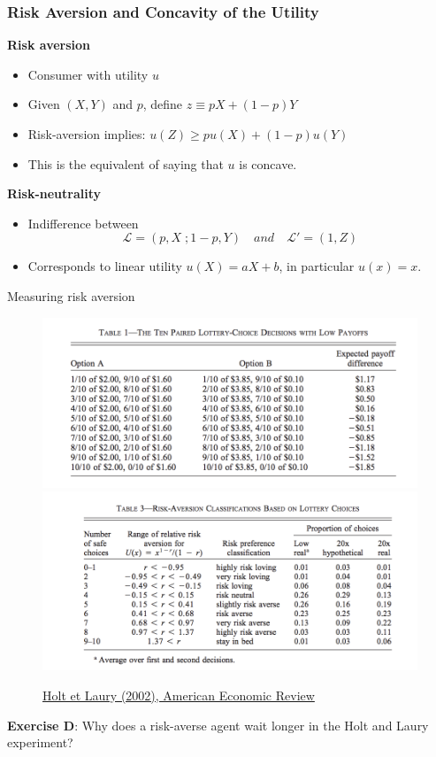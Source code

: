 \documentclass[handout]{beamer}
\newenvironment{iPar}[1]{\textbf{#1} \begin{itemize}}{\end{itemize}}
\newcommand{\mdp}{\medskip \pause}
\begin{document}
\begin{frame}\frametitle{Risk Aversion and Concavity of the Utility}

\begin{iPar}{Risk aversion} \item Consumer with utility $u$ \item Given
$(X,Y)$ and $p$, define  $z \equiv pX + (1-p)Y $ \item Risk-aversion implies: $ u(Z) \geq pu(X) + (1-p)u(Y)$ \item This is the equivalent of saying that $u$ is concave. \end{iPar}\mdp

\begin{iPar}{Risk-neutrality}
\item Indifference between $$ \mathcal L = (p, X\;; 1-p,Y) \quad and \quad  \mathcal L' = (1,Z)$$
\item Corresponds to linear utility $u(X) = a X + b$, in particular $u(x) = x$.
\end{iPar}

\end{frame}

\begin{frame}{Measuring risk aversion}


\begin{figure}
\centering
\includegraphics[scale=0.4]{lotteries.png} 
\includegraphics[scale=0.4]{choices.png}
\caption{\href{https://pubs.aeaweb.org/doi/pdfplus/10.1257/000282802762024700}{Holt et Laury (2002), American Economic Review}}
\end{figure}

\textbf{Exercise D}: Why does a risk-averse agent wait longer in the Holt and Laury experiment?
\end{frame}
\end{document}
